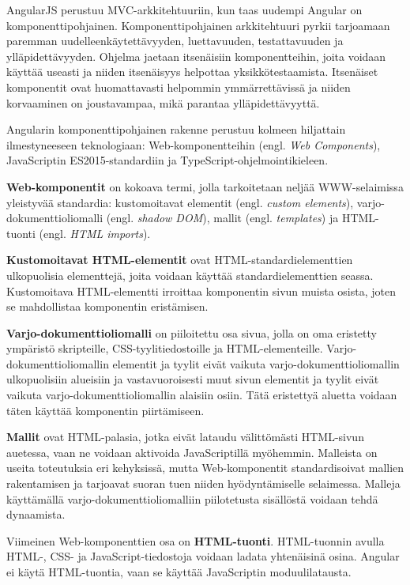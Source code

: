\documentclass[utf8]{gradu3}
\begin{document}
AngularJS perustuu MVC-arkkitehtuuriin, kun taas uudempi Angular on komponenttipohjainen. Komponenttipohjainen arkkitehtuuri pyrkii tarjoamaan paremman uudelleenkäytettävyyden, luettavuuden, testattavuuden ja ylläpidettävyyden. Ohjelma jaetaan itsenäisiin komponentteihin, joita voidaan käyttää useasti ja niiden itsenäisyys helpottaa yksikkötestaamista. Itsenäiset komponentit ovat huomattavasti helpommin ymmärrettävissä ja niiden korvaaminen on joustavampaa, mikä parantaa ylläpidettävyyttä. \parencite[]{good-and-bad-angular} 

Angularin komponenttipohjainen rakenne perustuu kolmeen hiljattain ilmestyneeseen teknologiaan: Web-komponentteihin (engl. \textit{Web Components}), JavaScriptin ES2015-standardiin ja TypeScript-ohjelmointikieleen.

\textbf{Web-komponentit} on kokoava termi, jolla tarkoitetaan neljää WWW-selaimissa yleistyvää standardia: kustomoitavat elementit (engl. \textit{custom elements}), varjo-dokumenttioliomalli (engl. \textit{shadow DOM}), mallit (engl. \textit{templates}) ja HTML-tuonti (engl. \textit{HTML imports}). 

\textbf{Kustomoitavat HTML-elementit} ovat HTML-standardielementtien ulkopuolisia elementtejä, joita voidaan käyttää standardielementtien seassa. Kustomoitava HTML-elementti irroittaa komponentin sivun muista osista, joten se mahdollistaa komponentin eristämisen. 

\textbf{Varjo-dokumenttioliomalli} on piiloitettu osa sivua, jolla on oma eristetty ympäristö skripteille, CSS-tyylitiedostoille ja HTML-elementeille. Varjo-dokumenttioliomallin elementit ja tyylit eivät vaikuta varjo-dokumenttioliomallin ulkopuolisiin alueisiin ja vastavuoroisesti muut sivun elementit ja tyylit eivät vaikuta varjo-dokumenttioliomallin alaisiin osiin. Tätä eristettyä aluetta voidaan täten käyttää komponentin piirtämiseen. 

\textbf{Mallit} ovat HTML-palasia, jotka eivät lataudu välittömästi HTML-sivun auetessa, vaan ne voidaan aktivoida JavaScriptillä myöhemmin. Malleista on useita toteutuksia eri kehyksissä, mutta Web-komponentit standardisoivat mallien rakentamisen ja tarjoavat suoran tuen niiden hyödyntämiselle selaimessa. Malleja käyttämällä varjo-dokumenttioliomalliin piilotetusta sisällöstä voidaan tehdä dynaamista. 

Viimeinen Web-komponenttien osa on \textbf{HTML-tuonti}. HTML-tuonnin avulla HTML-, CSS- ja JavaScript-tiedostoja voidaan ladata yhtenäisinä osina. Angular ei käytä HTML-tuontia, vaan se käyttää JavaScriptin moduulilatausta. \parencite[]{angular-6-by-example}
\end{document}

